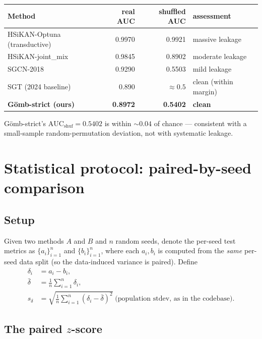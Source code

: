 \documentclass[11pt,a4paper]{article}
\theoremstyle{remark}
\newcommand{\GS}{G\"omb}
\begin{document}
\begin{center}
\begin{tabular}{lrrl}
\toprule
Method & real AUC & shuffled AUC & assessment \\
\midrule
HSiKAN-Optuna (transductive) & 0.9970 & 0.9921 & massive leakage \\
HSiKAN-joint\_mix & 0.9845 & 0.8902 & moderate leakage \\
SGCN-2018 & 0.9290 & 0.5503 & mild leakage \\
SGT (2024 baseline) & 0.890 & $\approx 0.5$ & clean (within margin) \\
\textbf{\GS{}-strict (ours)} & \textbf{0.8972} & \textbf{0.5402} & \textbf{clean} \\
\bottomrule
\end{tabular}
\end{center}

\GS{}-strict's $\mathrm{AUC}_{\text{shuf}} = 0.5402$ is within
$\sim 0.04$ of chance --- consistent with a small-sample
random-permutation deviation, not with systematic leakage.

\section{Statistical protocol: paired-by-seed comparison}\label{sec:paired-stats}

\subsection{Setup}

Given two methods $A$ and $B$ and $n$ random seeds, denote the
per-seed test metrics as $\{a_i\}_{i=1}^n$ and $\{b_i\}_{i=1}^n$,
where each $a_i, b_i$ is computed from the \emph{same} per-seed
data split (so the data-induced variance is paired). Define
\begin{align*}
  \delta_i &= a_i - b_i,                                        \\
  \bar\delta &= \frac{1}{n}\sum_{i=1}^n \delta_i,                \\
  s_\delta &= \sqrt{\frac{1}{n}\sum_{i=1}^n (\delta_i - \bar\delta)^2}
              \;\text{(population stdev, as in the codebase)}.
\end{align*}

\subsection{The paired $z$-score}
\end{document}
